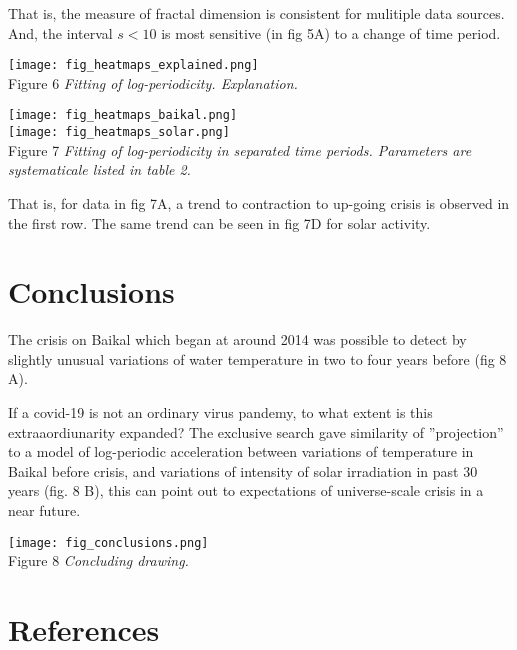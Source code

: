 \documentclass[a4paper]{article}
\begin{document}
That is, the measure of fractal dimension is consistent for mulitiple data sources. And, the interval $s < 10$ is most sensitive (in fig 5A) to a change of time period.

\newpage


\vskip 12pt

\texttt{[image: fig\_heatmaps\_explained.png]}\\
Figure 6 \textit{Fitting of log-periodicity. Explanation.}

\newpage

\texttt{[image: fig\_heatmaps\_baikal.png]}\\

\texttt{[image: fig\_heatmaps\_solar.png]}\\
Figure 7 \textit{Fitting of log-periodicity in separated time periods. Parameters are systematicale listed in table 2.}

That is, for data in fig 7A, a trend to contraction to up-going crisis is observed in the first row. The same trend can be seen in fig 7D for solar activity. 

\newpage

\section*{Conclusions}

The crisis on Baikal which began at around 2014 was possible to detect by slightly unusual variations of water temperature in two to four years before (fig 8 A). 

If a covid-19 is not an ordinary virus pandemy, to what extent is this extraaordiunarity expanded? The exclusive search gave similarity of ''projection'' to a model of log-periodic acceleration between variations of temperature in Baikal before crisis, and variations of intensity of solar irradiation in past 30 years (fig. 8 B), this can point out to expectations of universe-scale crisis in a near future.

\vskip 12pt

\texttt{[image: fig\_conclusions.png]}\\
Figure 8 \textit{Concluding drawing.}

\section*{References}
\end{document}
